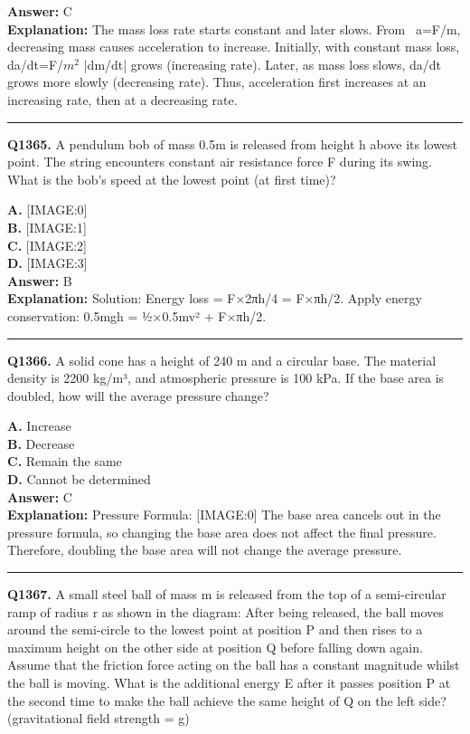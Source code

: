 \documentclass[12pt]{article}
\begin{document}
\textbf{Answer:} C \\
\textbf{Explanation:} The mass loss rate starts constant and later slows. From  a=F/m, decreasing mass causes acceleration to increase. Initially, with constant mass loss, da/dt=F/$m^2$ \cdot |dm/dt|
grows (increasing rate). Later, as mass loss slows, da/dt grows more slowly (decreasing rate). Thus, acceleration first increases at an increasing rate, then at a decreasing rate.

\hrule
\vspace{1em}


\noindent
\textbf{Q1365.} A pendulum bob of mass 0.5m is released from height h above its lowest point. The string encounters constant air resistance force F during its swing. What is the bob's speed at the lowest point (at first time)?



\textbf{A.} [IMAGE:0] \\
\textbf{B.} [IMAGE:1] \\
\textbf{C.} [IMAGE:2] \\
\textbf{D.} [IMAGE:3] \\

\textbf{Answer:} B \\
\textbf{Explanation:} Solution: Energy loss = F×2πh/4 = F×πh/2. Apply energy conservation: 0.5mgh = ½×0.5mv² + F×πh/2.

\hrule
\vspace{1em}


\noindent
\textbf{Q1366.} A solid cone has a height of 240 m and a circular base. The material density is 2200 kg/m³, and atmospheric pressure is 100 kPa. If the base area is doubled, how will the average pressure change?



\textbf{A.} Increase \\
\textbf{B.} Decrease \\
\textbf{C.} Remain the same \\
\textbf{D.} Cannot be determined \\

\textbf{Answer:} C \\
\textbf{Explanation:} Pressure Formula:
[IMAGE:0]
The base area cancels out in the pressure formula, so changing the base area does not affect the final pressure. Therefore, doubling the base area will not change the average pressure.

\hrule
\vspace{1em}


\noindent
\textbf{Q1367.} A small steel ball of mass m is released from the top of a semi-circular ramp of radius r as shown in the diagram:
After being released, the ball moves around the semi-circle to the lowest point at position P and then rises to a maximum height on the other side at position Q before falling down again. Assume that the friction force acting on the ball has a constant magnitude whilst the ball is moving. What is the additional energy E after it passes position P at the second time to make the ball achieve the same height of Q on the left side? (gravitational field strength = g)
\end{document}
